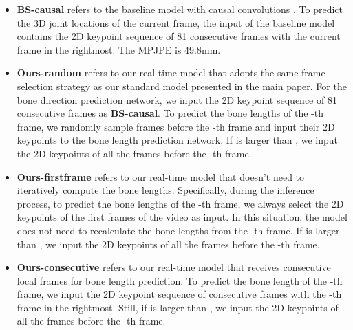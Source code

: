 \documentclass[journal]{IEEEtran}
\begin{document}
\begin{itemize}
\setlength\itemsep{0.0em}
\item \textbf{BS-causal} refers to the baseline model with causal convolutions \cite{pavllo20193d}. To predict the 3D joint locations of the current frame, the input of the baseline model contains the 2D keypoint sequence of 81 consecutive frames with the current frame in the rightmost. The MPJPE is 49.8mm.





\item \textbf{Ours-random} refers to our real-time model that adopts the same frame selection strategy as our standard model presented in the main paper. For the bone direction prediction network, we input the 2D keypoint sequence of 81 consecutive frames as \textbf{BS-causal}. To predict the bone lengths of the -th frame, we randomly sample  frames before the -th frame and input their 2D keypoints to the bone length prediction network. If  is larger than , we input the 2D keypoints of all the frames before the -th frame. 


\item \textbf{Ours-firstframe} refers to our real-time model that doesn't need to iteratively compute the bone lengths. Specifically, during the inference process, to predict the bone lengths of the -th frame, we always select the 2D keypoints of the first  frames of the video as input. In this situation, the model does not need to recalculate the bone lengths from the -th frame. If  is larger than , we input the 2D keypoints of all the frames before the -th frame. 

\item \textbf{Ours-consecutive} refers to our real-time model that receives consecutive local frames for bone length prediction. To predict the bone length of the -th frame, we input the 2D keypoint sequence of  consecutive frames with the -th frame in the rightmost. Still, if  is larger than , we input the 2D keypoints of all the frames before the -th frame.










\end{itemize}
\end{document}
